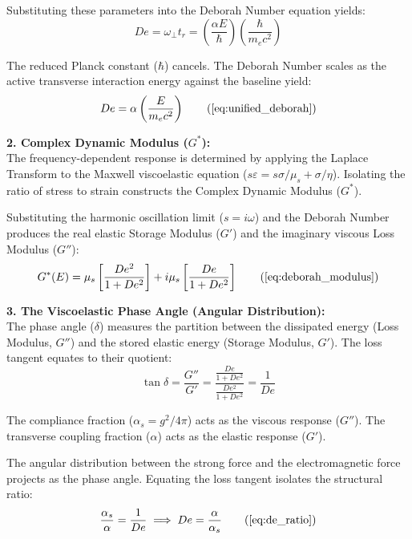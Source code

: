 Substituting these parameters into the Deborah Number equation yields: 
\begin{equation}
    De = \omega_{\perp} t_r = \left( \frac{\alpha E}{\hbar} \right) \left( \frac{\hbar}{m_e c^2} \right) 
\end{equation}

The reduced Planck constant ($\hbar$) cancels. The Deborah Number scales as the active transverse interaction energy against the baseline yield: 
\begin{equation}
    De = \alpha \left( \frac{E}{m_e c^2} \right) \tag{\ref{eq:unified_deborah}}
\end{equation}

\textbf{2. Complex Dynamic Modulus ($G^*$):} \\
The frequency-dependent response is determined by applying the Laplace Transform to the Maxwell viscoelastic equation ($s \varepsilon = s \sigma / \mu_s + \sigma / \eta$). Isolating the ratio of stress to strain constructs the Complex Dynamic Modulus ($G^*$).  

Substituting the harmonic oscillation limit ($s = i\omega$) and the Deborah Number produces the real elastic Storage Modulus ($G'$) and the imaginary viscous Loss Modulus ($G''$): 
\begin{equation}
    G^*(E) = \mu_s \left[ \frac{De^2}{1 + De^2} \right] + i \mu_s \left[ \frac{De}{1 + De^2} \right] \tag{\ref{eq:deborah_modulus}}
\end{equation}

\textbf{3. The Viscoelastic Phase Angle (Angular Distribution):} \\
The phase angle ($\delta$) measures the partition between the dissipated energy (Loss Modulus, $G''$) and the stored elastic energy (Storage Modulus, $G'$). The loss tangent equates to their quotient: 
\begin{equation}
    \tan \delta = \frac{G''}{G'} = \frac{\frac{De}{1+De^2}}{\frac{De^2}{1+De^2}} = \frac{1}{De}
\end{equation}

The compliance fraction ($\alpha_s = g^2/4\pi$) acts as the viscous response ($G''$). The transverse coupling fraction ($\alpha$) acts as the elastic response ($G'$).  

The angular distribution between the strong force and the electromagnetic force projects as the phase angle. Equating the loss tangent isolates the structural ratio: 
\begin{equation}
    \frac{\alpha_s}{\alpha} = \frac{1}{De} \implies De = \frac{\alpha}{\alpha_s} \tag{\ref{eq:de_ratio}}
\end{equation}

